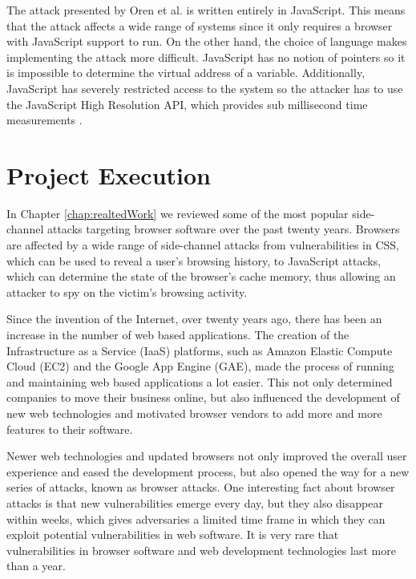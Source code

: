 \documentclass[10pt,a4paper,twoside]{book}
\begin{document}
The attack presented by Oren et al. is written entirely in JavaScript. This means that the attack affects a wide range of systems since it only requires a browser with JavaScript support to run. On the other hand, the choice of language makes implementing the attack more difficult. JavaScript has no notion of pointers so it is impossible to determine the virtual address of a variable. Additionally, JavaScript has severely restricted access to the system so the attacker has to use the JavaScript High Resolution API, which provides sub millisecond time measurements \cite{oren2015spy}.


\chapter{Project Execution}
\label{chap:execution}


In Chapter \ref{chap:realtedWork} we reviewed some of the most popular side-channel attacks targeting browser software over the past twenty years. Browsers are affected by a wide range of side-channel attacks from vulnerabilities in CSS, which can be used to reveal a user's browsing history, to JavaScript attacks, which can determine the state of the browser's cache memory, thus allowing an attacker to spy on the victim's browsing activity.

Since the invention of the Internet, over twenty years ago, there has been an increase in the number of web based applications. The creation of the Infrastructure as a Service (IaaS) platforms, such as Amazon Elastic Compute Cloud (EC2) and the Google App Engine (GAE), made the process of running and maintaining web based applications a lot easier. This not only determined companies to move their business online, but also influenced the development of new web technologies and motivated browser vendors to add more and more features to their software. 

Newer web technologies and updated browsers not only improved the overall user experience and eased the development process, but also opened the way for a new series of attacks, known as browser attacks. One interesting fact about browser attacks is that new vulnerabilities emerge every day, but they also disappear within weeks, which gives adversaries a limited time frame in which they can exploit potential vulnerabilities in web software. It is very rare that vulnerabilities in browser software and web development technologies last more than a year.
\end{document}
